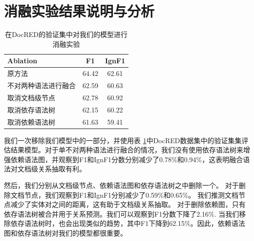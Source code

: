 \documentclass[bachelor]{thesis-uestc}
\begin{document}
\section{消融实验结果说明与分析}\label{sec:inter}

\begin{table}[]
    \caption{在DocRED的验证集中对我们的模型进行消融实验}
    \begin{tabular}{llc}
    \hline
    Ablation              & \multicolumn{1}{c}{F1} & \multicolumn{1}{l}{IgnF1} \\ \hline
    原方法             & 64.42                  & 62.61                     \\ 
    不对两种语法进行融合   & 62.59                  & 60.63                     \\
    取消文档级节点 & 62.78                   & 60.92                     \\
    取消依存语法树 & 62.15                  & 60.22                     \\ 
    取消依赖语法树   & 61.63                  & 59.41                     \\
    \hline
    \end{tabular}
    \label{fig_ablation}
\end{table}

我们一次移除我们模型中的一部分，并使用表 \ref{fig_ablation}中DocRED数据集中的验证集集评估结果模型。对于单不对两种语法进行融合的情况，我们没有使用依存语法树来增强依赖语法图，并观察到F1和IgnF1分数分别减少了0.78\%和0.94\%，这表明融合语法对文档级关系抽取有利。\par
然后，我们分别从文档级节点、依赖语法图和依存语法树之中删除一个。
对于删除文档节点，我们观察到F1和IgnF1分别减少了0.59\%和0.65\%。
我们推测文档节点减少了实体对之间的距离，这有助于文档级关系抽取。
对于删除依赖图，只有依存语法树被合并用于关系预测。我们可以观察到F1分数下降了2.16\%. 当我们移除依存语法树时，也会出现类似的趋势，其中F1下降到62.15\%。因此，依赖语法图和依存语法树对我们的模型都很重要。\par
\end{document}
